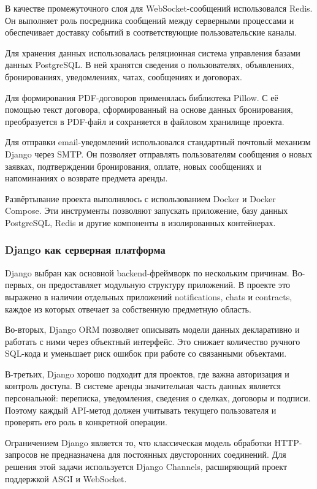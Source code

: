 В качестве промежуточного слоя для WebSocket-сообщений использовался Redis. Он выполняет роль посредника сообщений между серверными процессами и обеспечивает доставку событий в соответствующие пользовательские каналы.

Для хранения данных использовалась реляционная система управления базами данных PostgreSQL. В ней хранятся сведения о пользователях, объявлениях, бронированиях, уведомлениях, чатах, сообщениях и договорах. 

Для формирования PDF-договоров применялась библиотека Pillow. С её помощью текст договора, сформированный на основе данных бронирования, преобразуется в PDF-файл и сохраняется в файловом хранилище проекта.

Для отправки email-уведомлений использовался стандартный почтовый механизм Django через SMTP. Он позволяет отправлять пользователям сообщения о новых заявках, подтверждении бронирования, оплате, новых сообщениях и напоминаниях о возврате предмета аренды.

Развёртывание проекта выполнялось с использованием Docker и Docker Compose. Эти инструменты позволяют запускать приложение, базу данных PostgreSQL, Redis и другие компоненты в изолированных контейнерах.

\subsubsection{Django как серверная платформа}
Django выбран как основной backend-фреймворк по нескольким причинам. Во-первых, он предоставляет модульную структуру приложений. В проекте это выражено в наличии отдельных приложений notifications, chats и contracts, каждое из которых отвечает за собственную предметную область. 

Во-вторых, Django ORM позволяет описывать модели данных декларативно и работать с ними через объектный интерфейс. Это снижает количество ручного SQL-кода и уменьшает риск ошибок при работе со связанными объектами.

В-третьих, Django хорошо подходит для проектов, где важна авторизация и контроль доступа. В системе аренды значительная часть данных является персональной: переписка, уведомления, сведения о сделках, договоры и подписи. Поэтому каждый API-метод должен учитывать текущего пользователя и проверять его роль в конкретной операции.

Ограничением Django является то, что классическая модель обработки HTTP-запросов не предназначена для постоянных двусторонних соединений. Для решения этой задачи используется Django Channels, расширяющий проект поддержкой ASGI и WebSocket.

